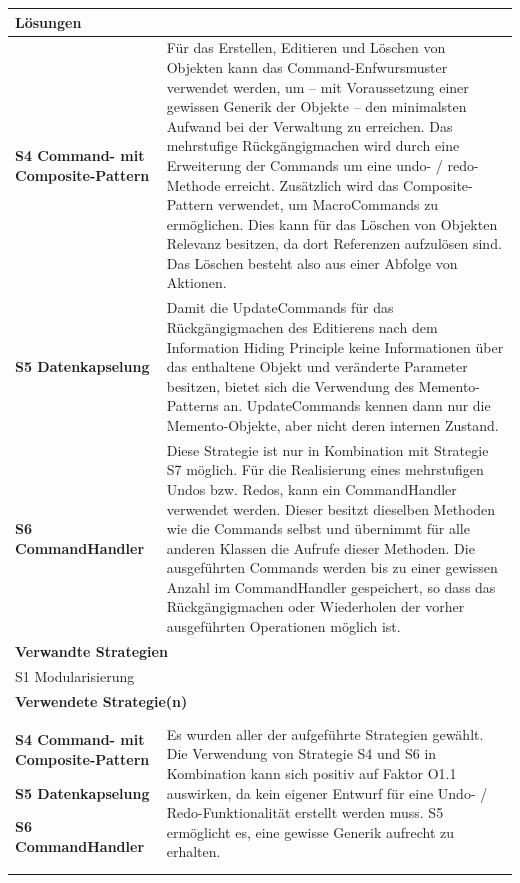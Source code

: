 \documentclass[fontsize=12pt,paper=a4,twoside]{scrartcl}
\begin{document}
\begin{tabularx}{\textwidth}{|p{6cm}|X|}
\hline
\multicolumn{2}{|l|}{\textbf{Lösungen}} \\\hline

\textbf{S4 Command- mit Composite-Pattern} & Für das Erstellen, Editieren und Löschen von Objekten kann das Command-Enfwursmuster verwendet werden, um -- mit Voraussetzung einer gewissen Generik der Objekte -- den minimalsten Aufwand  bei der Verwaltung zu erreichen. Das mehrstufige Rückgängigmachen wird durch eine Erweiterung der Commands um eine undo- / redo-Methode erreicht. Zusätzlich wird das Composite-Pattern verwendet, um MacroCommands zu ermöglichen. Dies kann für das Löschen von Objekten Relevanz besitzen, da dort Referenzen aufzulösen sind. Das Löschen besteht also aus einer Abfolge von Aktionen.\\
\textbf{S5 Datenkapselung} & Damit die UpdateCommands für das Rückgängigmachen des Editierens nach dem Information Hiding Principle keine Informationen über das enthaltene Objekt und veränderte Parameter besitzen, bietet sich die Verwendung des Memento-Patterns an. UpdateCommands kennen dann nur die Memento-Objekte, aber nicht deren internen Zustand.\\
\textbf{S6 CommandHandler} & Diese Strategie ist nur in Kombination mit Strategie S7 möglich. Für die Realisierung eines mehrstufigen Undos bzw. Redos, kann ein CommandHandler verwendet werden. Dieser besitzt dieselben Methoden wie die Commands selbst und übernimmt für alle anderen Klassen die Aufrufe dieser Methoden. Die ausgeführten Commands werden bis zu einer gewissen Anzahl im CommandHandler gespeichert, so dass das Rückgängigmachen oder Wiederholen der vorher ausgeführten Operationen möglich ist.\\\hline

\multicolumn{2}{|l|}{\textbf{Verwandte Strategien}} \\\hline
\multicolumn{2}{|l|}{S1 Modularisierung} \\\hline
   
\multicolumn{2}{|l|}{\textbf{Verwendete Strategie(n)}} \\\hline
\textbf{S4 Command- mit Composite-Pattern}\newline

\textbf{S5 Datenkapselung}\newline

\textbf{S6 CommandHandler}   & Es wurden aller der aufgeführte Strategien gewählt. Die Verwendung von Strategie S4 und S6 in Kombination kann sich positiv auf Faktor O1.1 auswirken, da kein eigener Entwurf für eine Undo- / Redo-Funktionalität erstellt werden muss. S5 ermöglicht es, eine gewisse Generik aufrecht zu erhalten.\\\hline
\end{tabularx}
\end{document}
